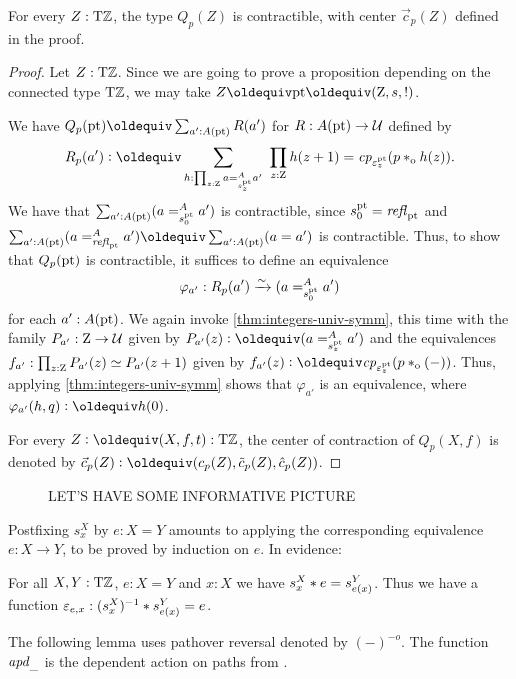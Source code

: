 \documentclass[a4,12pt]{amsart}
\begin{document}
\begin{lemma}\label{lem:guided-null-hmtps-dep}
  For every $Z:{\mathrm{T}\mathbb{Z}}$, the type $Q_p(Z)$ is contractible, 
  with center $\vec{c}_p(Z)$ defined in the proof.
\end{lemma}
\begin{proof}
  Let $Z:{\mathrm{T}\mathbb{Z}}$. Since we are going to prove a proposition
  depending on the connected type ${\mathrm{T}\mathbb{Z}}$,
  we may take $Z\jdeq\pt\jdeq(\zet,s,!)$.

  We have $Q_p(\pt)\jdeq \sum_{a':A(\pt)} R(a')$ for $R : A({\mathord{\mathrm{pt}}}) \to \mathcal{U}$ defined by
  \[
    R_p(a') \defeq \sum_{h : \prod_{z:\zet} a =^A_{s^\pt_z} a'}~
    \prod_{z:\zet} h(z+1) = \cp{\varepsilon^\pt_z}(p \cto h(z)).
  \]
  We have that $\sum_{a':A({\mathord{\mathrm{pt}}})} (a =^A_{s^{\mathord{\mathrm{pt}}}_0} {a'})$ is contractible,
  since $s^{\mathord{\mathrm{pt}}}_0 = \mathop{{\it refl}_{{\mathord{\mathrm{pt}}}}}$ and 
  $\sum_{a':A(\pt)} (a =^A_{\refl{\pt}} a') \jdeq \sum_{a':A(\pt)} (a = a')$
  is contractible.
  Thus, to show that $Q_p({\mathord{\mathrm{pt}}})$ is contractible,
  it suffices to define an equivalence
  \[
    \varphi_{a'} : R_p(a') \xrightarrow{\sim}{} (a =^A_{s^{\mathord{\mathrm{pt}}}_0} {a'})
  \]
  for each $a' : A({\mathord{\mathrm{pt}}})$.
  We again invoke \cref{thm:integers-univ-symm},
  this time with the family $P_{a'} : \mathrm{Z} \to \mathcal{U}$ given 
  by $P_{a'}(z) \defeq (a =^A_{s^\pt_z} {a'})$
  and the equivalences $f_{a'} : \prod_{z:\mathrm{Z}} P_{a'}(z)\simeq P_{a'}(z+1)$ 
  given by $f_{a'}(z) \defeq \cp{\varepsilon^\pt_z}(p \cto ({-}))$.
  Thus, applying \cref{thm:integers-univ-symm}
  shows that $\varphi_{a'}$ is an equivalence,
  where $\varphi_{a'}(h,q) \defeq h(0)$.

For every $Z\defeq(X,f,t):\TorZ$, the center of contraction of $Q_p(X,f)$ 
is denoted by $\vec{c}_p(Z)\defeq(c_p(Z),\tilde{c}_p(Z),\hat{c}_p(Z))$.
\end{proof}


\begin{figure}
\caption{\label{fig:TorZ-induction}LET'S HAVE SOME INFORMATIVE PICTURE}
\end{figure}

Postfixing $s^X_x$ by $e: X=Y$ amounts to
applying the corresponding equivalence $e: X\to Y$, to be proved
by induction on $e$. In evidence:

\begin{lemma}\label{lem:s-X-x-*-e}
  For all $X,Y:{\mathrm{T}\mathbb{Z}}$, $e: X=Y$ and $x:X$ we have $s^X_x * e = s^Y_{e(x)}$.
  Thus we have a function $\varepsilon_{e,x} : (s^X_x)^{-1} * s^Y_{e(x)} = e$.
\end{lemma}

The following lemma uses pathover reversal denoted by $({-})^{-o}$.
The function $\mathop{{\it apd}_{\_}}$ is the dependent action on paths from \cite[Ch. XX]{hottbook}.
\end{document}
